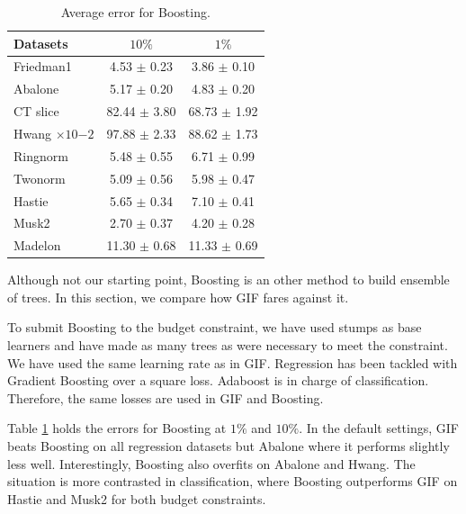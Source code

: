 \documentclass{article}
\begin{document}
\begin{table}[t]
\caption{Average error for Boosting.}
\label{tab:boosting}
\vskip 0.15in
\begin{center}
\begin{small}
\begin{sc}
\begin{tabular}{l|c|c}
\hline
Datasets & $10\%$ & $1\%$ \\
\hline
Friedman1 & 4.53 $\pm$ 0.23 & 3.86 $\pm$ 0.10 \\
Abalone & 5.17 $\pm$ 0.20 & 4.83 $\pm$ 0.20 \\
CT slice & 82.44 $\pm$ 3.80 & 68.73 $\pm$ 1.92 \\
Hwang $\times 10{-2}$ & 97.88 $\pm$ 2.33 &  88.62 $\pm$ 1.73 \\
\hline
Ringnorm & 5.48 $\pm$ 0.55 & 6.71 $\pm$ 0.99 \\
Twonorm & 5.09 $\pm$ 0.56 & 5.98 $\pm$ 0.47 \\
Hastie & 5.65 $\pm$ 0.34 & 7.10 $\pm$ 0.41 \\
Musk2 & 2.70 $\pm$ 0.37 & 4.20 $\pm$ 0.28 \\
Madelon & 11.30 $\pm$ 0.68 & 11.33 $\pm$ 0.69 \\
\hline
\end{tabular}
\end{sc}
\end{small}
\end{center}
\vskip -0.1in
\end{table}


Although not our starting point, Boosting is an other method to build ensemble 
of trees. In this section, we compare how GIF fares against it. 

To submit Boosting to the budget constraint, we have used stumps as base 
learners and have made as many trees as were necessary to meet the constraint. 
We have used the same learning rate as in GIF. Regression has been tackled with 
Gradient Boosting over a square loss. Adaboost is in charge of classification. 
Therefore, the same losses are used in GIF and Boosting.

Table \ref{tab:boosting} holds the errors for Boosting at $1\%$ and $10\%$. In 
the default settings, GIF beats Boosting on all regression datasets but Abalone 
where it performs slightly less well. Interestingly, Boosting also overfits on 
Abalone and Hwang. The situation is more contrasted in classification, where 
Boosting outperforms GIF on Hastie and Musk2 for both budget constraints.
\end{document}
